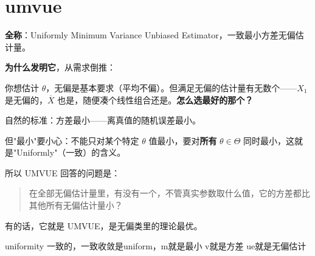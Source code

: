\section{umvue}
\begin{note}
    \textbf{全称}：Uniformly Minimum Variance Unbiased Estimator，一致最小方差无偏估计量。

\textbf{为什么发明它}，从需求倒推：

你想估计 $\theta$，无偏是基本要求（平均不偏）。但满足无偏的估计量有无数个——$X_1$ 是无偏的，$\overline{X}$ 也是，随便凑个线性组合还是。\textbf{怎么选最好的那个？}

自然的标准：方差最小——离真值的随机误差最小。

但"最小"要小心：不能只对某个特定 $\theta$ 值最小，要对\textbf{所有} $\theta \in \Theta$ 同时最小，这就是"Uniformly"（一致）的含义。

所以 UMVUE 回答的问题是：
\begin{quote}
在全部无偏估计量里，有没有一个，不管真实参数取什么值，它的方差都比其他所有无偏估计量小？
\end{quote}
有的话，它就是 UMVUE，是无偏类里的理论最优。
\end{note}
\begin{dxtips}
    uniformity 一致的，一致收敛是uniform，m就是最小 v就是方差 ue就是无偏估计
\end{dxtips}
